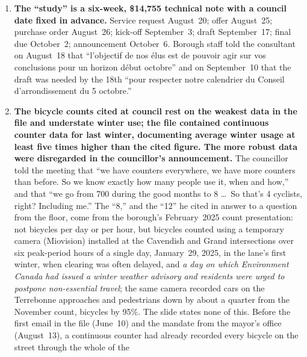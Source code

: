 \documentclass[11pt,letterpaper]{article}
\begin{document}
\begin{enumerate}[nosep]
\begin{minipage}[t]{\linewidth}
    the public.\end{minipage}\vspace{0.35em}
\item \begin{minipage}[t]{\linewidth}\textbf{The ``study'' is a six-week, \$14{,}755 technical note with a
    council date fixed in advance.} Service request August~20; offer
    August~25; purchase order August~26; kick-off September~3; draft
    September~17; final due October~2; announcement October~6. Borough staff
    told the consultant on August~18 that ``l'objectif de nos \'elus est de
    pouvoir agir sur vos conclusions pour un horizon d\'ebut octobre'' and on
    September~10 that the draft was needed by the 18th ``pour respecter notre
    calendrier du Conseil d'arrondissement du 5 octobre.''\end{minipage}\vspace{0.35em}
\item \begin{minipage}[t]{\linewidth}\textbf{The bicycle counts cited at council rest on the weakest
    data in the file and understate winter use; the file contained
    continuous counter data for last winter, documenting average winter usage
    at least five times higher than the cited figure. The more robust data
    were disregarded in the councillor's announcement.} The councillor told
    the meeting that ``we have counters everywhere, we have more counters
    than before. So we know exactly how many people use it, when and how,''
    and that ``we go from 700 during the good months to 8 \ldots\ So that's 4
    cyclists, right? Including me.'' The ``8,'' and the ``12'' he cited in
    answer to a question from the floor, come from the borough's February~2025
    count presentation: not bicycles per day or per hour, but bicycles
    counted using a temporary camera (Miovision) installed at the Cavendish
    and Grand intersections over six
    peak-period hours of a single day, January~29, 2025, in the lane's first
    winter, when clearing was often delayed, and \emph{a day on which Environment
    Canada had issued a winter weather advisory and residents were urged to
    postpone non-essential travel}; the same camera recorded cars on the
    Terrebonne approaches and pedestrians down by about a quarter from the
    November count, bicycles by 95\%. The slide states none of this. Before the first email in the file (June~10) and the
    mandate from the mayor's office (August~13), a continuous counter had
    already recorded every bicycle on the street through the whole of the

\end{minipage}
\end{enumerate}
\end{document}
